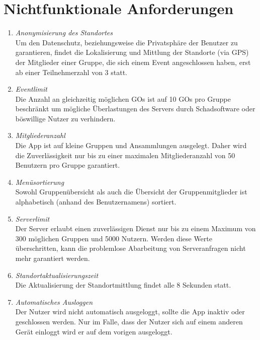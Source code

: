 \documentclass[parskip=full]{scrartcl}
\def\threedigits#1{%
  \ifnum#1<100 0\fi
  \ifnum#1<10 0\fi
  \number#1}
\begin{document}
\section{Nichtfunktionale Anforderungen}
\begin{enumerate}[label={\textbf{/NF\protect\threedigits{\theenumi}0/}}, leftmargin=*]
		\item \textit{Anonymisierung des Standortes} \\
		Um den Datenschutz, beziehungsweise die Privatsphäre der Benutzer zu garantieren, findet die Lokalisierung und Mittlung der Standorte (via GPS) der Mitglieder einer Gruppe, die sich einem Event angeschlossen haben, erst ab einer Teilnehmerzahl von 3 statt. 
		
		\item \textit{Eventlimit} \\
		Die Anzahl an gleichzeitig möglichen GOs ist auf 10 GOs pro Gruppe beschränkt um mögliche Überlastungen des Servers durch Schadsoftware oder böswillige Nutzer zu verhindern.
		
		\item \textit{Mitgliederanzahl} \\
		Die App ist auf kleine Gruppen und Ansammlungen ausgelegt. Daher wird die Zuverlässigkeit nur bis zu einer maximalen Mitgliederanzahl von 50 Benutzern pro Gruppe garantiert.
		
		\item \textit{Menüsortierung} \\
		Sowohl Gruppenübersicht als auch die Übersicht der Gruppenmitglieder ist alphabetisch (anhand des Benutzernamens) sortiert. 
		
		\item \textit{Serverlimit} \\
		Der Server erlaubt einen zuverlässigen Dienst nur bis zu einem Maximum von 300 möglichen Gruppen und 5000 Nutzern. Werden diese Werte überschritten, kann die problemlose Abarbeitung von Serveranfragen nicht mehr garantiert werden.
		
		\item \textit{Standortaktualisierungszeit} \\
		Die Aktualisierung der Standortmittlung findet alle 8 Sekunden statt.
		
		\item \textit{Automatisches Ausloggen} \\
		Der Nutzer wird nicht automatisch ausgeloggt, sollte die App inaktiv oder geschlossen werden. Nur im Falle, dass der Nutzer sich auf einem anderen Gerät einloggt wird er auf dem vorigen ausgeloggt.
		

\end{enumerate}
\end{document}

